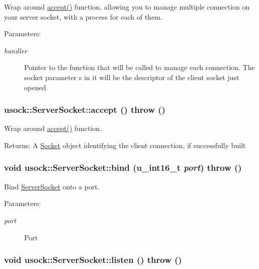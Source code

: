 Wrap around \hyperlink{classusock_1_1ServerSocket_bf0477af52a725ced6afad86d7b3e794}{accept()} function, allowing you to manage multiple connection on your server socket, with a process for each of them. 

\begin{Desc}
\item[Parameters:]
\begin{description}
\item[{\em handler}]Pointer to the function that will be called to manage each connection. The socket parameter s in it will be the descriptor of the client socket just opened \end{description}
\end{Desc}
\hypertarget{classusock_1_1ServerSocket_bf0477af52a725ced6afad86d7b3e794}{
\subsubsection[{accept}]{ usock::ServerSocket::accept ()  throw ()}}
\label{classusock_1_1ServerSocket_bf0477af52a725ced6afad86d7b3e794}


Wrap around \hyperlink{classusock_1_1ServerSocket_bf0477af52a725ced6afad86d7b3e794}{accept()} function. 

\begin{Desc}
\item[Returns:]A \hyperlink{classusock_1_1Socket}{Socket} object identifying the client connection, if successfully built \end{Desc}
\hypertarget{classusock_1_1ServerSocket_9ecf37cae8379df6eaf366ab88df244a}{
\subsubsection[{bind}]{\setlength{\rightskip}{0pt plus 5cm}void usock::ServerSocket::bind (u\_\-int16\_\-t {\em port})  throw ()}}
\label{classusock_1_1ServerSocket_9ecf37cae8379df6eaf366ab88df244a}


Bind \hyperlink{classusock_1_1ServerSocket}{ServerSocket} onto a port. 

\begin{Desc}
\item[Parameters:]
\begin{description}
\item[{\em port}]Port \end{description}
\end{Desc}
\hypertarget{classusock_1_1ServerSocket_c6cd2070380b84275c5f69265c57713b}{
\subsubsection[{listen}]{\setlength{\rightskip}{0pt plus 5cm}void usock::ServerSocket::listen ()  throw ()}}
\label{classusock_1_1ServerSocket_c6cd2070380b84275c5f69265c57713b}


